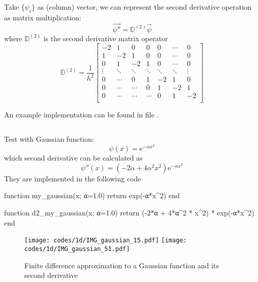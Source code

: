 Take $\{ \psi_{i} \}$ as (column) vector, we can represent the second derivative operation
as matrix multiplication:
\begin{equation}
\vec{\psi''} = \mathbb{D}^{(2)} \vec{\psi}
\end{equation}
where $\mathbb{D}^{(2)}$ is the second derivative matrix operator
\begin{equation}
\mathbb{D}^{(2)} = \frac{1}{h^2}
\begin{bmatrix}
-2  &  1  &  0  &  0  & 0 & \cdots & 0 \\
 1  & -2  &  1  &  0  & 0 & \cdots & 0 \\
 0  &  1  & -2  &  1  & 0 & \cdots & 0 \\
 \vdots  &  \ddots  &  \ddots  & \ddots  & \ddots  & \ddots & \vdots \\
 0 & \cdots & 0 & 1 & -2 & 1 & 0 \\
 0  &  \cdots  & \cdots & 0  & 1  & -2  & 1 \\
 0  &  \cdots  & \cdots & \cdots & 0  &  1  & -2 \\
\end{bmatrix}
\end{equation}

An example implementation can be found in file .

\inputminted[breaklines]{julia}{codes/1d/build_D2_matrix_3pt.jl}

Test with Gaussian function:
\begin{equation}
\psi(x) = \mathrm{e}^{-\alpha x^2}
\end{equation}
%
which second derivative can be calculated as
%
\begin{equation}
\psi''(x) = \left( -2 \alpha + 4\alpha^2 x^2 \right) \mathrm{e}^{-\alpha x^2}
\end{equation}
%
They are implemented in the following code
\begin{juliacode}
function my_gaussian(x; α=1.0)
    return exp(-α*x^2)
end

function d2_my_gaussian(x; α=1.0)
    return (-2*α + 4*α^2 * x^2) * exp(-α*x^2)
end
\end{juliacode}

\begin{figure}[H]
{\center
\texttt{[image: codes/1d/IMG\_gaussian\_15.pdf]}
\texttt{[image: codes/1d/IMG\_gaussian\_51.pdf]}
\par}
\caption{Finite difference approximation to a Gaussian function and its second derivative}
\end{figure}



